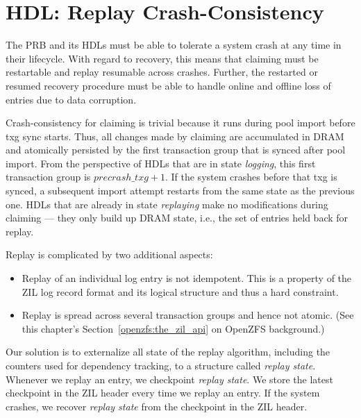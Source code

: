 \documentclass[12pt,a4paper,twoside]{book}
\begin{document}
\section{HDL: Replay Crash-Consistency}\label{di:prb:ccrecovery}

The PRB and its HDLs must be able to tolerate a system crash at any time in their lifecycle.
With regard to recovery, this means that claiming must be restartable and replay resumable across crashes.
Further, the restarted or resumed recovery procedure must be able to handle online and offline loss of entries due to data corruption.

Crash-consistency for claiming is trivial because it runs during pool import before txg sync starts.
Thus, all changes made by claiming are accumulated in DRAM and atomically persisted by the first transaction group that is synced after pool import.
From the perspective of HDLs that are in state \textit{logging}, this first transaction group is $precrash\_txg + 1$.
If the system crashes before that txg is synced, a subsequent import attempt restarts from the same state as the previous one.
HDLs that are already in state \textit{replaying} make no modifications during claiming --- they only build up DRAM state, i.e., the set of entries held back for replay.

Replay is complicated by two additional aspects:
\begin{itemize}[noitemsep]
    \item Replay of an individual log entry is not idempotent. This is a property of the ZIL log record format and its logical structure and thus a hard constraint.
    \item Replay is spread across several transaction groups and hence not atomic.
        (See this chapter's Section~\ref{openzfs:the_zil_api} on OpenZFS background.)
\end{itemize}
Our solution is to externalize all state of the replay algorithm, including the counters used for dependency tracking, to a structure called \textit{replay state}.
Whenever we replay an entry, we checkpoint \textit{replay state}.
We store the latest checkpoint in the ZIL header every time we replay an entry.
If the system crashes, we recover \textit{replay state} from the checkpoint in the ZIL header.
\end{document}
